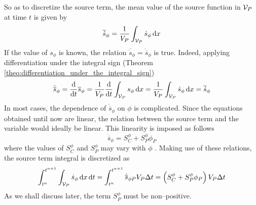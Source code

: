 So as to discretize the source term, the mean value of the source function in
$\mathcal{V}_{P}$ at time $t$ is given by
\begin{equation}
	\overline{\dot{s}}_\phi = 
	\frac{1}{V_P} \int_{\mathcal{V}_{P}} \dot{s}_\phi \dd{x}
\end{equation}
If the value of $s_\phi$ is known, the relation $\overline{\dot{s}}_\phi =
\dot{\overline{s}}_\phi$ is true. Indeed, applying differentiation under the
integral sign (Theorem \ref{theo:differentiation_under_the_integral_sign})
\begin{equation}
	\dot{\overline{s}}_\phi = 
	\frac{\dd}{\dd{t}} \overline{s}_\phi = 
	\frac{1}{V_P} \frac{\dd}{\dd{t}} \int_{\mathcal{V}_{P}} s_\phi \dd{x} = 
	\frac{1}{V_P} \int_{\mathcal{V}_{P}} \dot{s}_\phi \dd{x} = 
	\overline{\dot{s}}_\phi
\end{equation}
In most cases, the dependence of $\dot{\overline{s}}_\phi$ on $\phi$ is
complicated. Since the equations obtained until now are linear, the relation
between the source term and the variable would ideally be linear. This linearity
is imposed as follows
\begin{equation}
	\dot{\overline{s}}_\phi = S_C^\phi + S_P^\phi \phi_P
\end{equation}
where the values of $S_C^\phi$ and $S_P^\phi$ may vary with $\phi$
\cite{patankar2008numerical}. Making use of these relations, the source term
integral is discretized as
\begin{equation}
	\int_{t^n}^{t^{n+1}} \int_{\mathcal{V}_{P}} \dot{s}_\phi \dd{x} \dd{t} = 
	\int_{t^n}^{t^{n+1}} 
	\dot{\overline{s}}_{\phi P} V_P \Delta t = 
	\left( S_C^\phi + S_P^\phi \phi_P \right) V_P \Delta t
\end{equation}
As we shall discuss later, the term $S_P^\phi$ must be non--positive.

